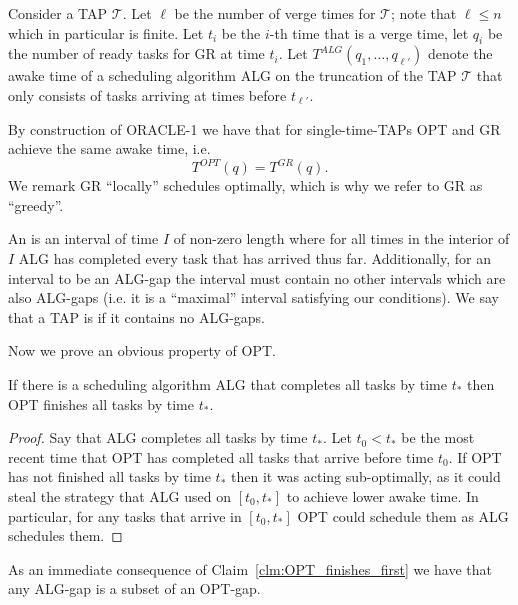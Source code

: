 Consider a TAP $\mathcal{T}$. Let $\ell$ be the number of verge
times for $\mathcal{T}$; note that $\ell \le n$ which in
particular is finite. Let $t_i$ be the $i$-th time that is a
verge time, let $q_i$ be the number of ready tasks for GR at
time $t_i$. Let $T^{ALG}(q_1, \ldots, q_{\ell'})$ denote the
awake time of a scheduling algorithm ALG on the truncation of the
TAP $\mathcal{T}$ that only consists of tasks arriving at times
before $t_{\ell'}$.

By construction of ORACLE-1 we have that for single-time-TAPs OPT
and GR achieve the same awake time, i.e.
\begin{equation}
  \label{eq:same_single}
  T^{OPT}(q) = T^{GR}(q).
\end{equation}
We remark GR \enquote{locally} schedules optimally, which is why
we refer to GR as \enquote{greedy}. 

An  is an interval of time $I$ of non-zero length where for
all times in the interior of $I$ ALG has completed every
task that has arrived thus far. Additionally, for an interval to
be an ALG-gap the interval must contain no other intervals which
are also ALG-gaps (i.e. it is a \enquote{maximal} interval
satisfying our conditions).
We say that a TAP is  if it contains no ALG-gaps.

Now we prove an obvious property of OPT.
\begin{claim}
  \label{clm:OPT_finishes_first}
  If there is a scheduling algorithm ALG that completes all tasks by
  time $t_*$ then OPT finishes all tasks by time $t_*$.
\end{claim}
\begin{proof}
  Say that ALG completes all tasks by time $t_*$. Let $t_0 < t_*$
  be the most recent time that OPT has completed all tasks that
  arrive before time $t_0$. If OPT has not finished all tasks by
  time $t_*$ then it was acting sub-optimally, as it could steal
  the strategy that ALG used on $[t_0, t_*]$ to achieve lower
  awake time. In particular, for any tasks that arrive in $[t_0,
  t_*]$ OPT could schedule them as ALG schedules them. 
\end{proof}
As an immediate consequence of Claim~\ref{clm:OPT_finishes_first}
we have that any ALG-gap is a subset of an OPT-gap.

